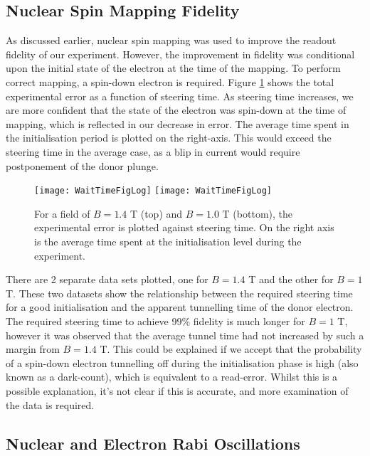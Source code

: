 
\subsection{Nuclear Spin Mapping Fidelity}

	As discussed earlier, nuclear spin mapping was used to improve the readout fidelity of our experiment. However, the improvement in fidelity was conditional upon the initial state of the electron at the time of the mapping. To perform correct mapping, a spin-down electron is required. Figure \ref{fig::wait_time} shows the total experimental error as a function of steering time. As steering time increases, we are more confident that the state of the electron was spin-down at the time of mapping, which is reflected in our decrease in error. The average time spent in the initialisation period is plotted on the right-axis. This would exceed the steering time in the average case, as a blip in current would require postponement of the donor plunge.
	\begin{figure}[htbp!]
		\centering
		\texttt{[image: WaitTimeFigLog]}
		\texttt{[image: WaitTimeFigLog]}
		\caption{For a field of $B = 1.4$ T (top) and $B = 1.0$ T (bottom), the experimental error is plotted against steering time. On  the right axis is the average time spent at the initialisation level during the experiment.}
		\label{fig::wait_time}
	\end{figure}
	
	There are 2 separate data sets plotted, one for $B = 1.4$ T and the other for $B = 1$ T. These two datasets show the relationship between the required steering time for a good initialisation and the apparent tunnelling time of the donor electron. The required steering time to achieve 99\% fidelity is much longer for $B = 1$ T, however it was observed that the average tunnel time had not increased by such a margin from $B = 1.4$ T. This could be explained if we accept that the probability of a spin-down electron tunnelling off during the initialisation phase is high (also known as a dark-count), which is equivalent to a read-error. Whilst this is a possible explanation, it's not clear if this is accurate, and more examination of the data is required.

\subsection{Nuclear and Electron Rabi Oscillations}

